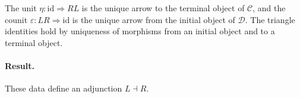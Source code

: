 \documentclass[11pt]{article}
\newcommand{\id}{\mathrm{id}}
\begin{document}
The unit $\eta : \id \Rightarrow RL$ is the unique arrow to the terminal object of $\mathcal{C}$,
and the counit $\varepsilon : LR \Rightarrow \id$ is the unique arrow from the initial object of $\mathcal{D}$.
The triangle identities hold by uniqueness of morphisms from an initial object and to a terminal object.

\paragraph{Result.}
These data define an adjunction $L \dashv R$.
\end{document}
